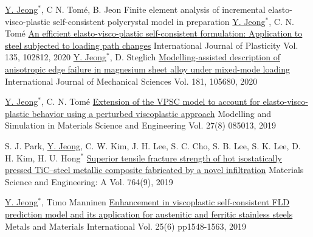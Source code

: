 
\begin{cventries}
  \cventry
  {\underline{Y. Jeong}$^*$, C N. Tom\'{e}, B. Jeon}
  {Finite element analysis of incremental elasto-visco-plastic self-consistent polycrystal model}
  {}
  {in preparation}
  {
  }
  \cventry
  {\underline{Y. Jeong}$^*$, C. N. Tom\'{e}}
  {\href{https://doi.org/10.1016/j.ijplas.2020.102812}{An efficient elasto-visco-plastic self-consistent formulation: Application to steel subjected to loading path changes}}
  {International Journal of Plasticity}
  {Vol. 135, 102812, 2020}
  {
  }
  \cventry
  {\underline{Y. Jeong}$^*$, D. Steglich}
  {\href{https://doi.org/10.1016/j.ijmecsci.2020.105680}{Modelling-assisted description of anisotropic edge failure in magnesium sheet alloy under mixed-mode loading}}
  {International Journal of Mechanical Sciences}
  {Vol. 181, 105680, 2020}
  {
  }

  \cventry
  {\underline{Y. Jeong}$^*$, C. N. Tom\'{e}}
  {\href{https://doi.org/10.1088/1361-651X/ab4b66}{Extension of the VPSC model to account for elasto-visco-plastic behavior using a perturbed viscoplastic approach}}
  {Modelling and Simulation in Materials Science and Engineering}
  {Vol. 27(8) 085013, 2019}
  {
  }

  \cventry
  {S. J. Park, \underline{Y. Jeong}, C. W. Kim, J. H. Lee, S. C. Cho, S. B. Lee, S. K. Lee, D. H. Kim, H. U. Hong$^*$}
  {\href{https://doi.org/10.1016/j.msea.2019.138260}{Superior tensile fracture strength of hot isostatically pressed TiC–steel metallic composite fabricated by a novel infiltration}}
  {Materials Science and Engineering: A}
  {Vol. 764(9), 2019}
  {
  }

  \cventry
  {\underline{Y. Jeong}$^*$, Timo Manninen}
  {\href{https://doi.org/10.1007/s12540-019-00292-5}{Enhancement in viscoplastic self-consistent FLD prediction model and its application for austenitic and ferritic stainless steels}}
  {Metals and Materials International}
  {Vol. 25(6) pp1548-1563, 2019}
  {
  }


\end{cventries}
